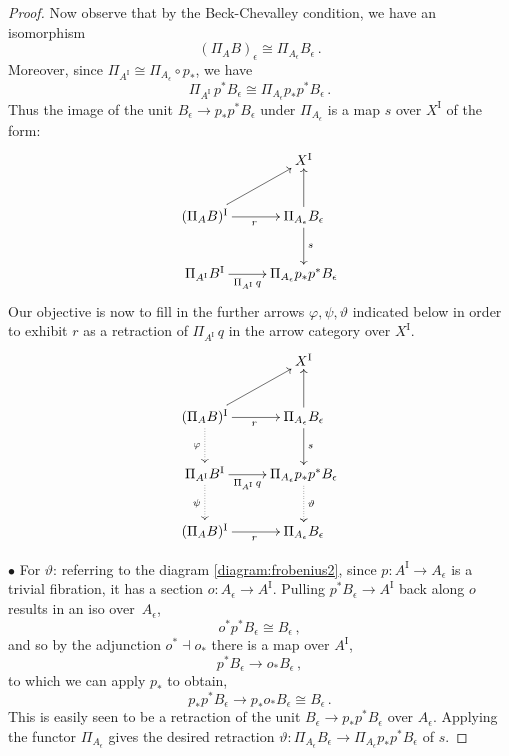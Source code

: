 \documentclass[11pt]{article}
\newcommand{\ra}{\ensuremath{\rightarrow}}
\newcommand{\I}{\ensuremath{\mathrm{I}}}
\theoremstyle{remark}
\theoremstyle{definition}
\begin{document}
\begin{proof}
Now observe that by the Beck-Chevalley condition, we have an isomorphism 
\[
(\Pi_AB )_\epsilon \cong \Pi_{A_\epsilon} B_\epsilon \,.
\]
Moreover, since $\Pi_{A^\I} \cong \Pi_{A_\epsilon} \circ p_*$, we have
\[
 \Pi_{A^\I}\,p^*B_\epsilon \cong \Pi_{A_\epsilon} p_*p^* B_\epsilon \,.
\]
Thus the image of the unit $B_\epsilon \ra p_*p^* B_\epsilon$ under $\Pi_{A_\epsilon}$ is a map $s$ over $X^\I$ of the form:
\begin{equation}\label{diagram:frobenius3}
\xymatrix{
& X^\I  \\
 (\Pi_AB)^\I  \ar[r]_r   \ar[ru] & \Pi_{A_\epsilon}B_\epsilon  \ar[u] \ar[d]^{s}\\
 \Pi_{A^\I}B^\I \ar[r]_-{\Pi_{A^\I}\,q} & \Pi_{A_\epsilon} p_*p^* B_\epsilon
}
\end{equation}
Our objective is now to fill in the further arrows $\varphi, \psi,\vartheta$ indicated below in order to exhibit $r$ as a retraction of $\Pi_{A^\I}\,q$ in the arrow category over $X^\I$.
\begin{equation}\label{diagram:frobenius4}
\xymatrix{
& X^\I  \\
 (\Pi_AB)^\I  \ar[r]_r  \ar[ru] \ar@{..>}[d]_\varphi & \Pi_{A_\epsilon}B_\epsilon  \ar[u] \ar[d]^{s}\\
 \Pi_{A^\I}B^\I \ar[r]_-{\Pi_{A^\I}\,q} \ar@{..>}[d]_\psi & \Pi_{A_\epsilon} p_*p^* B_\epsilon \ar@{..>}[d]^\vartheta\\
  (\Pi_AB)^\I  \ar[r]_r  & \Pi_{A_\epsilon}B_\epsilon
}
\end{equation}

\smallskip

\noindent $\bullet$ For $\vartheta$: referring to the diagram \eqref{diagram:frobenius2}, since $p : A^\I \ra A_\epsilon$ is a trivial fibration, it has a section $o :  A_\epsilon \ra A^\I$.  Pulling  $p^*B_\epsilon \ra A^\I$ back along $o$ results in an iso over~$A_\epsilon$,
\[
o^*p^* B_\epsilon \cong B_\epsilon \,,
\]
and so by the adjunction $o^*\!\dashv o_*$ there is a map over $A^\I$,
\[
p^* B_\epsilon \to o_* B_\epsilon \,,
\]
to which we can apply $p_*$ to obtain,
\[
p_*p^* B_\epsilon \to p_*o_*B_\epsilon \cong B_\epsilon\,.
\]
This is easily seen to be a retraction of the unit $B_\epsilon \ra p_*p^* B_\epsilon$ over $A_\epsilon$.  Applying the functor $ \Pi_{A_\epsilon}$ gives the desired retraction $\vartheta : \Pi_{A_\epsilon}B_\epsilon \ra \Pi_{A_\epsilon}p_*p^* B_\epsilon$ of $s$.


\end{proof}
\end{document}
